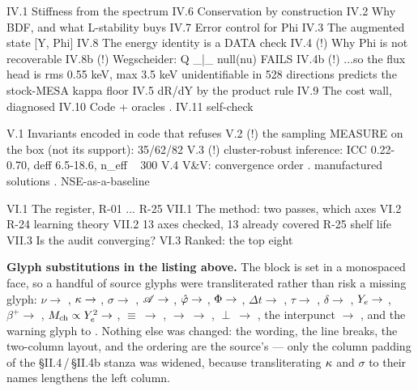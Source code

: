 \begin{srclistingtiny}
IV.1 Stiffness from the spectrum         IV.6  Conservation by construction
IV.2 Why BDF, and what L-stability buys  IV.7  Error control for Phi
IV.3 The augmented state [Y, Phi]        IV.8  The energy identity is a DATA check
IV.4 (!) Why Phi is not recoverable      IV.8b (!) Wegscheider: Q _|_ null(nu) FAILS
IV.4b (!) ...so the flux head is               rms 0.55 keV, max 3.5 keV
      unidentifiable in 528 directions         predicts the stock-MESA kappa floor
IV.5 dR/dY by the product rule           IV.9  The cost wall, diagnosed
                                         IV.10 Code + oracles . IV.11 self-check

V.1  Invariants encoded in code that refuses
V.2  (!) the sampling MEASURE on the box (not its support): 35/62/82%
V.3  (!) cluster-robust inference: ICC 0.22-0.70, deff 6.5-18.6, n_eff ~ 300
V.4  V&V: convergence order . manufactured solutions . NSE-as-a-baseline

VI.1 The register, R-01 ... R-25         VII.1 The method: two passes, which axes
VI.2 R-24 learning theory                VII.2 13 axes checked, 13 already covered
     R-25 shelf life                     VII.3 Is the audit converging?
VI.3 Ranked: the top eight
\end{srclistingtiny}

\begin{aside}
\textbf{Glyph substitutions in the listing above.} The block is set in a
monospaced face, so a handful of source glyphs were transliterated rather than
risk a missing glyph: $\nu \to$ , $\kappa \to$ ,
$\sigma \to$ , $\mathscr{A} \to$ , $\hat{\varphi} \to$
, $\Phi \to$ , $\Delta t \to$ ,
$\tau \to$ , $\delta \to$ , $Y_{e} \to$ ,
$\beta^+ \to$ , $M_{\mathrm{ch}} \propto Y_{e}^2 \to$ , $\equiv\ \to$ \code{=}, $\to\ \to$ \code{->},
$\perp\ \to$ \code{\_|\_}, the interpunct $\to$ , and the warning glyph
to \code{(!)}. Nothing else was changed: the wording, the line breaks, the
two-column layout, and the ordering are the source's --- only the column
padding of the \S II.4\,/\,\S II.4b stanza was widened, because transliterating
$\kappa$ and $\sigma$ to their names lengthens the left column.
\end{aside}
